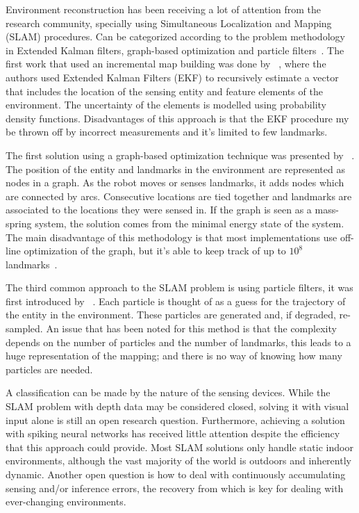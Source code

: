 Environment reconstruction has been receiving a lot of attention from the research  community, specially using Simultaneous Localization and Mapping (SLAM) procedures. 
Can be categorized according to the problem methodology in Extended Kalman filters, graph-based optimization and particle filters~\cite{Thrun2008_SLAM}.
The first work that used an incremental map building was done by \citeauthor{smith1990estimating}~\cite{smith1990estimating}, where the authors used Extended Kalman Filters (EKF) to recursively estimate a vector that includes the location of the sensing entity and feature elements of the environment. The uncertainty of the elements is modelled using probability density functions. Disadvantages of this approach is that the EKF procedure my be thrown off by incorrect measurements and it's limited to few landmarks.

The first solution using a graph-based optimization technique was presented by \citeauthor{lu1997globally}~\cite{lu1997globally}. The position of the entity and landmarks in the environment are represented as nodes in a graph. As the robot moves or senses landmarks, it adds nodes which are connected by arcs. Consecutive locations are tied together and landmarks are associated to the locations they were sensed in. If the graph is seen as a mass-spring system, the solution comes from the minimal energy state of the system. The main disadvantage of this methodology is that most implementations use off-line optimization of the graph, but it's able to keep track of up to $10^8$ landmarks~\cite{Thrun2008_SLAM}. 

The third common approach to the SLAM problem is using particle filters, it was first introduced by \citeauthor{montemerlo2002fastslam}~\cite{montemerlo2002fastslam}. Each particle is thought of as a guess for the trajectory of the entity in the environment. These particles are generated and, if degraded, re-sampled. An issue that has been noted for this method is that the complexity depends on the number of particles and the number of landmarks, this leads to a huge representation of the mapping; and there is no way of knowing how many particles are needed. 

A classification can be made by the nature of the sensing devices. While the SLAM problem with depth data may be considered closed, solving it with visual input alone is still an open research question. Furthermore, achieving a solution with spiking neural networks has received little attention despite the efficiency that this approach could provide. Most SLAM solutions only handle static indoor environments, although the vast majority of the world is outdoors and inherently dynamic. Another open question is how to deal with continuously accumulating sensing and/or inference errors, the recovery from which is key for dealing with ever-changing environments. 

